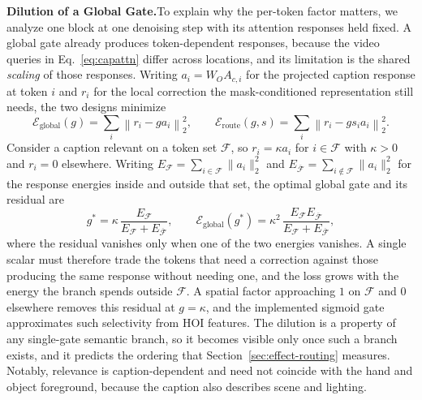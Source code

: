 \documentclass{article}
\begin{document}
\textbf{Dilution of a Global Gate.}\quad To explain why the per-token factor
matters, we analyze one block at one denoising step with its attention
responses held fixed. A global gate already produces token-dependent responses,
because the video queries in Eq.~\ref{eq:capattn} differ across locations, and
its limitation is the shared \emph{scaling} of those responses. Writing
$a_i=W_O A_{c,i}$ for the projected caption response at token $i$ and $r_i$ for
the local correction the mask-conditioned representation still needs, the two
designs minimize
\begin{equation}
\mathcal{E}_{\mathrm{global}}(g)=\sum_i\left\|r_i-g a_i\right\|_2^2,
\qquad
\mathcal{E}_{\mathrm{route}}(g,s)=\sum_i\left\|r_i-g s_i a_i\right\|_2^2 .
\label{eq:error}
\end{equation}
Consider a caption relevant on a token set $\mathcal{F}$, so $r_i=\kappa a_i$ for
$i\in\mathcal{F}$ with $\kappa>0$ and $r_i=0$ elsewhere. Writing
$E_{\mathcal{F}}=\sum_{i\in\mathcal{F}}\|a_i\|_2^2$ and
$E_{\overline{\mathcal{F}}}=\sum_{i\notin\mathcal{F}}\|a_i\|_2^2$ for the
response energies inside and outside that set, the optimal global gate and its
residual are
\begin{equation}
g^*=\kappa\,\frac{E_{\mathcal{F}}}
{E_{\mathcal{F}}+E_{\overline{\mathcal{F}}}},\qquad
\mathcal{E}_{\mathrm{global}}(g^*)=\kappa^2\,
\frac{E_{\mathcal{F}}E_{\overline{\mathcal{F}}}}
{E_{\mathcal{F}}+E_{\overline{\mathcal{F}}}},
\label{eq:dilution}
\end{equation}
where the residual vanishes only when one of the two energies vanishes. A single
scalar must therefore trade the tokens that need a correction against those
producing the same response without needing one, and the loss grows with the
energy the branch spends outside $\mathcal{F}$. A spatial factor approaching $1$
on $\mathcal{F}$ and $0$ elsewhere removes this residual at $g=\kappa$, and the
implemented sigmoid gate approximates such selectivity from HOI features. The
dilution is a property of any single-gate semantic branch, so it becomes visible
only once such a branch exists, and it predicts the ordering that
Section~\ref{sec:effect-routing} measures. Notably, relevance is caption-dependent and need not coincide with the hand and
object foreground, because the caption also describes scene and lighting.
\end{document}
